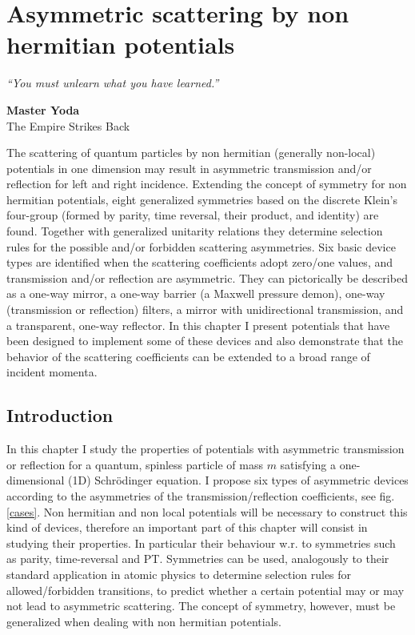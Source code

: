 
\chapter{Asymmetric scattering by non hermitian potentials}
\label{Chapter1}
%
\null\vfill
\textit{``You must unlearn what you have learned.''}
\begin{flushright}
  {\bf Master Yoda}\\
  The Empire Strikes Back
\end{flushright}
\vfill\null

The scattering of quantum particles by non hermitian (generally non-local)  potentials in one dimension may result in asymmetric transmission and/or reflection for left and right incidence.
Extending the concept of symmetry for non hermitian potentials, eight generalized symmetries based on the discrete  Klein's four-group
(formed by parity, time reversal, their product, and identity) are found. Together with generalized unitarity relations they determine selection rules for the possible and/or forbidden scattering asymmetries. Six basic device types are identified when the scattering coefficients adopt zero/one values, and transmission and/or reflection are asymmetric. They can pictorically be described as a
one-way mirror, a one-way barrier (a Maxwell  pressure demon), one-way (transmission or reflection) filters, a mirror with unidirectional transmission, and a transparent, one-way reflector. In this chapter I present potentials that have been designed to implement some of these devices and also demonstrate that the  behavior of the scattering
coefficients can be extended to a broad range of incident momenta.
%
\newpage
%

\section{Introduction\label{sec:chapter1_Introduction}}

In this chapter I study the properties of potentials with asymmetric transmission or reflection for a quantum, spinless particle of mass $m$ satisfying a one-dimensional (1D) Schr\"{o}dinger equation. I propose six types of asymmetric devices according to the asymmetries of the transmission/reflection coefficients, see fig. \ref{cases}. Non hermitian and non local potentials will be necessary to construct this kind of devices, therefore an important part of this chapter will consist in studying their properties. In particular their behaviour w.r. to symmetries such as parity, time-reversal and PT. Symmetries can be used, analogously to their standard application in atomic physics to determine selection rules for allowed/forbidden transitions, to predict whether a certain potential may or may not lead to asymmetric scattering. The concept of symmetry, however, must be generalized when dealing with non hermitian potentials.

